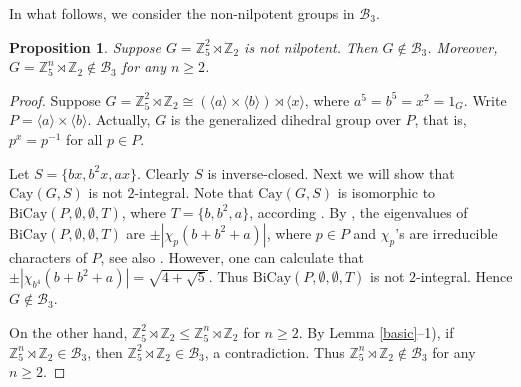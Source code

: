 \documentclass[12pt,a4paper]{article}
\newtheorem{pro}[thm]{Proposition}
\def \leq {\leqslant}
\def \geq {\geqslant}
\begin{document}
	In what follows, we consider the non-nilpotent groups in $\mathcal{B}_3$.
	\begin{pro}\label{pro:Z5n}
		Suppose $G=\mathbb{Z}_5^2\rtimes \mathbb{Z}_2$ is not nilpotent.
		Then $G\notin \mathcal{B}_3$.
		Moreover, $G=\mathbb{Z}_5^n\rtimes \mathbb{Z}_2\notin \mathcal{B}_3$ for any $n\geq 2$.
	\end{pro}
	\begin{proof}
		Suppose $G=\mathbb{Z}_5^2\rtimes \mathbb{Z}_2\cong (\langle a\rangle \times \langle b\rangle) \rtimes \langle x\rangle$, where $a^5=b^5=x^2=1_G$.
		Write $P=\langle a\rangle \times \langle b\rangle$.
		Actually, $G$ is the generalized dihedral group over $P$, that is, $p^x=p^{-1}$ for all $p\in P$.
		
		Let $S=\{bx,b^2x,ax\}$.
		Clearly $S$ is inverse-closed.
		Next we will show that $\mathrm{Cay}(G,S)$ is not $2$-integral.
		Note that $\mathrm{Cay}(G,S)$ is isomorphic to $\mathrm{BiCay}(P,\emptyset,\emptyset,T)$, where $T=\{b,b^2,a\}$, according \cite[Lemma 8]{AT}.
		By \cite[Theorem 3.2]{bicay}, the eigenvalues of $\mathrm{BiCay}(P,\emptyset,\emptyset,T)$ are $\pm |\chi_p(b+b^2+a)|$, where $p\in P$ and $\chi_p$'s are irreducible characters of $P$, see also \cite[Section 3.]{A-PST}.
		However, one can calculate that $\pm |\chi_{b^4}(b+b^2+a)|=\sqrt{4+\sqrt{5}}$.
		Thus $\mathrm{BiCay}(P,\emptyset,\emptyset,T)$ is not $2$-integral.
		Hence $G\notin \mathcal{B}_3$.
		
		On the other hand, $\mathbb{Z}_5^2\rtimes \mathbb{Z}_2\leq \mathbb{Z}_5^n\rtimes \mathbb{Z}_2$ for $n\geq 2$.
		By Lemma \ref{basic}--1), if $\mathbb{Z}_5^n\rtimes \mathbb{Z}_2\in\mathcal{B}_3$, then $\mathbb{Z}_5^2\rtimes \mathbb{Z}_2\in\mathcal{B}_3$, a contradiction.
		Thus $\mathbb{Z}_5^n\rtimes \mathbb{Z}_2\notin \mathcal{B}_3$ for any $n\geq 2$.
	\end{proof}
	
\end{document}
